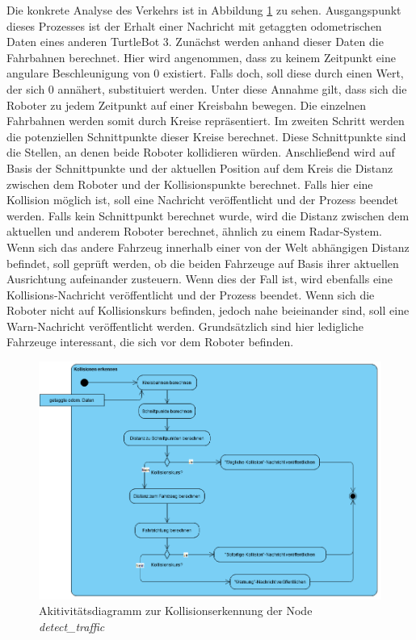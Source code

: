 Die konkrete Analyse des Verkehrs ist in Abbildung \ref{fig:DetectTraffic_Danger_activity} zu sehen. Ausgangspunkt dieses Prozesses ist der Erhalt einer Nachricht mit getaggten odometrischen
Daten eines anderen TurtleBot 3. Zunächst werden anhand dieser Daten die Fahrbahnen berechnet. Hier wird angenommen, dass zu keinem Zeitpunkt eine angulare Beschleunigung von 0 existiert.
Falls doch, soll diese durch einen Wert, der sich 0 annähert, substituiert werden. Unter diese Annahme gilt, dass sich die Roboter zu jedem Zeitpunkt auf einer Kreisbahn bewegen.
Die einzelnen Fahrbahnen werden somit durch Kreise repräsentiert. Im zweiten Schritt werden die potenziellen Schnittpunkte dieser Kreise berechnet. Diese Schnittpunkte sind die Stellen,
an denen beide Roboter kollidieren würden. Anschließend wird auf Basis der Schnittpunkte und der aktuellen Position auf dem Kreis die Distanz zwischen dem Roboter und der Kollisionspunkte berechnet.
Falls hier eine Kollision möglich ist, soll eine Nachricht veröffentlicht und der Prozess beendet werden. Falls kein Schnittpunkt berechnet wurde, wird die Distanz zwischen dem aktuellen und
anderem Roboter berechnet, ähnlich zu einem Radar-System. Wenn sich das andere Fahrzeug innerhalb einer von der Welt abhängigen Distanz befindet, soll geprüft werden, ob die beiden Fahrzeuge
auf Basis ihrer aktuellen Ausrichtung aufeinander zusteuern. Wenn dies der Fall ist, wird ebenfalls eine Kollisions-Nachricht veröffentlicht und der Prozess beendet. Wenn sich die Roboter
nicht auf Kollisionskurs befinden, jedoch nahe beieinander sind, soll eine Warn-Nachricht veröffentlicht werden. Grundsätzlich sind hier ledigliche Fahrzeuge interessant, die sich vor
dem Roboter befinden. 

\begin{figure}[h!]
  \centering
  \includegraphics[width=\linewidth]{images/DetectTraffic_danger_activity.PNG}
  \caption{Akitivitätsdiagramm zur Kollisionserkennung der Node \textit{detect\_traffic}}
  \label{fig:DetectTraffic_Danger_activity}
\end{figure}

